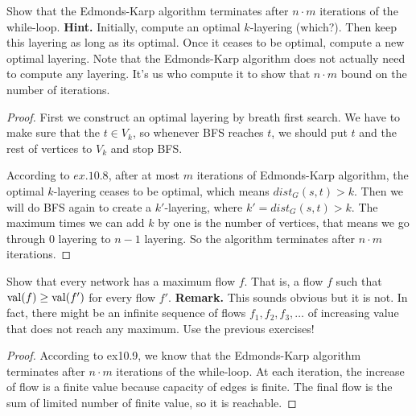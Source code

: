 
\begin{exercise}
Show that the Edmonds-Karp algorithm terminates after $n \cdot m$ iterations of the 
while-loop. \textbf{Hint.} Initially, compute an optimal $k$-layering (which?). Then keep
this layering as long as its optimal. Once it ceases to be optimal, compute a new optimal
layering. Note that the Edmonds-Karp algorithm does not actually need to compute any
layering. It's us who compute it to show that $n \cdot m$ bound on the number of iterations.
\end{exercise}

\begin{proof}
First we construct an optimal layering by breath first search. We have to make sure that the $t \in V_k$, so whenever BFS reaches $t$, we should put $t$ and the rest of vertices to $V_k$ and stop BFS. 
\par According to $ex.10.8$, after at most $m$ iterations of Edmonds-Karp algorithm, the optimal $k$-layering ceases to be optimal, which means $dist_G\left(s,t\right)>k$. Then we will do BFS again to create a $k'$-layering, where $k'=dist_G\left(s,t\right)>k$. The maximum times we can add $k$ by one is the number of vertices, that means we go through $0$ layering to $n-1$ layering. So the algorithm terminates after $n\cdot m$ iterations.

\end{proof}

\begin{exercise}
   Show that every network has a maximum flow $f$. 
   That is, a flow $f$ such that ${\rm val}(f) \geq {\rm val}(f')$ for every flow $f'$.
   \textbf{Remark.} This sounds obvious but it is not. In fact, there might be an infinite
   sequence of flows $f_1, f_2, f_3, \dots$ of increasing value that does not reach any maximum.
    Use the previous exercises!
\end{exercise}

\begin{proof}
According to ex10.9, we know that the Edmonds-Karp algorithm terminates after $n \cdot m$ iterations of the while-loop. At each iteration, the increase of flow is a finite value because capacity of edges is finite. The final flow is the sum of limited number of finite value, so it is reachable.  
\end{proof}

